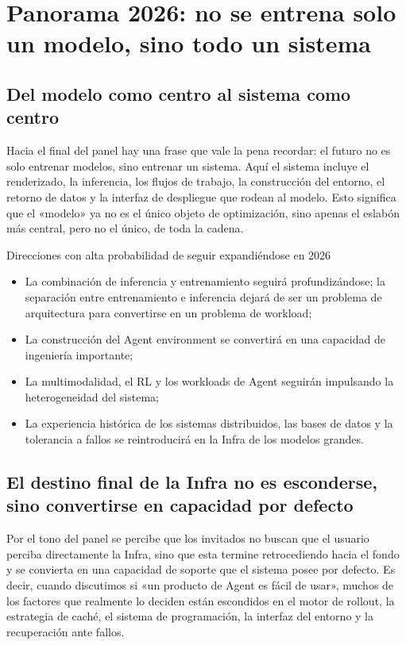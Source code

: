 \section{Panorama 2026: no se entrena solo un modelo, sino todo un sistema}

\subsection{Del modelo como centro al sistema como centro}
Hacia el final del panel hay una frase que vale la pena recordar: el futuro no es solo entrenar modelos, sino entrenar un sistema. Aquí el sistema incluye el renderizado, la inferencia, los flujos de trabajo, la construcción del entorno, el retorno de datos y la interfaz de despliegue que rodean al modelo. Esto significa que el «modelo» ya no es el único objeto de optimización, sino apenas el eslabón más central, pero no el único, de toda la cadena.

\begin{importantbox}{Direcciones con alta probabilidad de seguir expandiéndose en 2026}
\begin{itemize}
  \item La combinación de inferencia y entrenamiento seguirá profundizándose; la separación entre entrenamiento e inferencia dejará de ser un problema de arquitectura para convertirse en un problema de workload;
  \item La construcción del Agent environment se convertirá en una capacidad de ingeniería importante;
  \item La multimodalidad, el RL y los workloads de Agent seguirán impulsando la heterogeneidad del sistema;
  \item La experiencia histórica de los sistemas distribuidos, las bases de datos y la tolerancia a fallos se reintroducirá en la Infra de los modelos grandes.
\end{itemize}
\end{importantbox}

\subsection{El destino final de la Infra no es esconderse, sino convertirse en capacidad por defecto}
Por el tono del panel se percibe que los invitados no buscan que el usuario perciba directamente la Infra, sino que esta termine retrocediendo hacia el fondo y se convierta en una capacidad de soporte que el sistema posee por defecto. Es decir, cuando discutimos si «un producto de Agent es fácil de usar», muchos de los factores que realmente lo deciden están escondidos en el motor de rollout, la estrategia de caché, el sistema de programación, la interfaz del entorno y la recuperación ante fallos.

